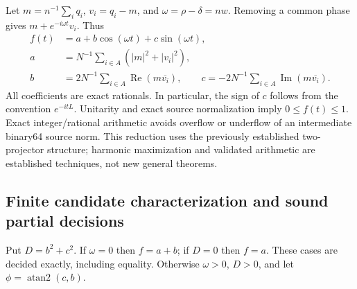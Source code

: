 \documentclass[11pt,a4paper]{article}
\theoremstyle{definition}\newtheorem{definition}[theorem]{Definition}
\begin{document}
Let $m=n^{-1}\sum_i q_i$, $v_i=q_i-m$, and $\omega=\rho-\delta=nw$. Removing a common phase gives $m+e^{-i\omega t}v_i$. Thus
\begin{align}
 f(t)&=a+b\cos(\omega t)+c\sin(\omega t),\label{eq:windowharmonic}\\
 a&=N^{-1}\sum_{i\in A}(|m|^2+|v_i|^2),\nonumber\\
 b&=2N^{-1}\sum_{i\in A}\operatorname{Re}(m\overline{v_i}),\qquad
 c=-2N^{-1}\sum_{i\in A}\operatorname{Im}(m\overline{v_i}).\nonumber
\end{align}
All coefficients are exact rationals. In particular, the sign of $c$ follows from the convention $e^{-itL}$. Unitarity and exact source normalization imply $0\leq f(t)\leq1$. Exact integer/rational arithmetic avoids overflow or underflow of an intermediate binary64 source norm. This reduction uses the previously established two-projector structure; harmonic maximization and validated arithmetic are established techniques, not new general theorems.

\subsection{Finite candidate characterization and sound partial decisions}
Put $D=b^2+c^2$. If $\omega=0$ then $f=a+b$; if $D=0$ then $f=a$. These cases are decided exactly, including equality. Otherwise $\omega>0$, $D>0$, and let $\phi=\operatorname{atan2}(c,b)$.
\end{document}
